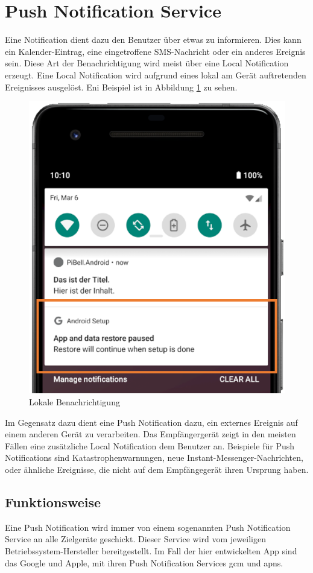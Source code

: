 \label{ch:push}
\section{Push Notification Service}
Eine Notification dient dazu den Benutzer über etwas zu informieren. Dies kann ein Kalender-Eintrag, eine eingetroffene SMS-Nachricht oder ein anderes Ereignis sein. Diese Art der Benachrichtigung wird meist über eine Local Notification erzeugt. Eine Local Notification wird aufgrund eines lokal am Gerät auftretenden Ereignisses ausgelöst. Eni Beispiel ist in Abbildung \ref{fig:local-notification} zu sehen.
\begin{figure}
    \centering\includegraphics[width=.5\linewidth]{images/xamarin/LocalNotification.png}
    \caption{Lokale Benachrichtigung}
    \label{fig:local-notification}
\end{figure}

Im Gegensatz dazu dient eine Push Notification dazu, ein externes Ereignis auf einem anderen Gerät zu verarbeiten.
Das Empfängergerät zeigt in den meisten Fällen eine zusätzliche Local Notification dem Benutzer an.
Beispiele für Push Notifications sind Katastrophenwarnungen, neue Instant-Messenger-Nachrichten, oder ähnliche Ereignisse, die nicht auf dem Empfängegerät ihren Ursprung haben.

\subsection{Funktionsweise}
Eine Push Notification wird immer von einem sogenannten Push Notification Service an alle Zielgeräte geschickt.
Dieser Service wird vom jeweiligen Betriebssystem-Hersteller bereitgestellt.
Im Fall der hier entwickelten App sind das Google und Apple, mit ihren Push Notification Services \ac{gcm} und \ac{apns}.\par

